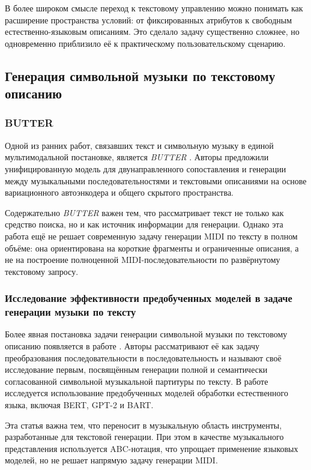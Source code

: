 \documentclass[a4paper,12pt]{extarticle}
\begin{document}
В более широком смысле переход к текстовому управлению можно понимать
как расширение пространства условий: от фиксированных атрибутов к
свободным естественно-языковым описаниям. Это сделало задачу существенно
сложнее, но одновременно приблизило её к практическому пользовательскому
сценарию.

\subsection{Генерация символьной музыки по текстовому описанию}

\subsubsection{BUTTER}

Одной из ранних работ, связавших текст и символьную музыку в единой
мультимодальной постановке, является \textit{BUTTER}
\cite{zhang2020butter}. Авторы предложили унифицированную модель для
двунаправленного сопоставления и генерации между музыкальными
последовательностями и текстовыми описаниями на основе вариационного
автоэнкодера и общего скрытого пространства.

Содержательно \textit{BUTTER} важен тем, что рассматривает текст не
только как средство поиска, но и как источник информации для генерации.
Однако эта работа ещё не решает современную задачу генерации MIDI по
тексту в полном объёме: она ориентирована на короткие фрагменты и
ограниченные описания, а не на построение полноценной
MIDI-последовательности по развёрнутому текстовому запросу.

\subsubsection{Исследование эффективности предобученных моделей в задаче генерации музыки по тексту}

Более явная постановка задачи генерации символьной музыки по текстовому
описанию появляется в работе \cite{wu2022texttomusic}. Авторы
рассматривают её как задачу преобразования последовательности в
последовательность и называют своё исследование первым, посвящённым
генерации полной и семантически согласованной символьной музыкальной
партитуры по тексту. В работе исследуется использование предобученных
моделей обработки естественного языка, включая BERT, GPT-2 и BART.

Эта статья важна тем, что переносит в музыкальную область инструменты,
разработанные для текстовой генерации. При этом в качестве музыкального
представления используется ABC-нотация, что упрощает применение языковых
моделей, но не решает напрямую задачу генерации MIDI.
\end{document}
